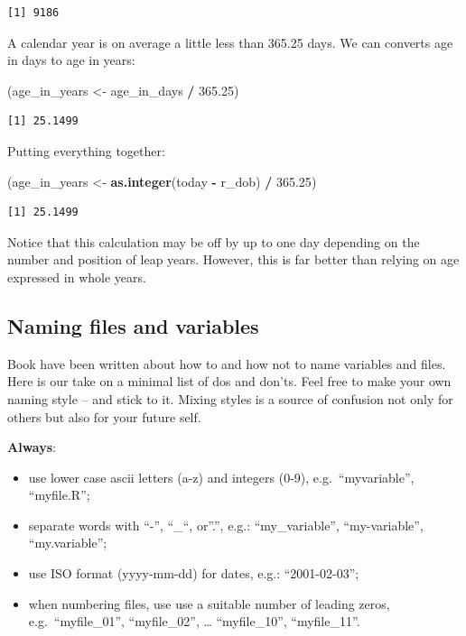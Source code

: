 \documentclass[
]{book}
\newenvironment{Shaded}{\begin{snugshade}}{\end{snugshade}}
\newcommand{\FloatTok}[1]{\textcolor[rgb]{0.00,0.00,0.81}{#1}}
\newcommand{\FunctionTok}[1]{\textcolor[rgb]{0.13,0.29,0.53}{\textbf{#1}}}
\newcommand{\NormalTok}[1]{#1}
\newcommand{\OtherTok}[1]{\textcolor[rgb]{0.56,0.35,0.01}{#1}}
\newcommand{\SpecialCharTok}[1]{\textcolor[rgb]{0.81,0.36,0.00}{\textbf{#1}}}
\begin{document}
\begin{verbatim}
[1] 9186
\end{verbatim}

A calendar year is on average a little less than 365.25 days. We can converts age in days to age in years:

\begin{Shaded}
\begin{Highlighting}[]
\NormalTok{(age\_in\_years }\OtherTok{\textless{}{-}}\NormalTok{ age\_in\_days }\SpecialCharTok{/} \FloatTok{365.25}\NormalTok{)}
\end{Highlighting}
\end{Shaded}

\begin{verbatim}
[1] 25.1499
\end{verbatim}

Putting everything together:

\begin{Shaded}
\begin{Highlighting}[]
\NormalTok{(age\_in\_years }\OtherTok{\textless{}{-}} \FunctionTok{as.integer}\NormalTok{(today }\SpecialCharTok{{-}}\NormalTok{ r\_dob) }\SpecialCharTok{/} \FloatTok{365.25}\NormalTok{)}
\end{Highlighting}
\end{Shaded}

\begin{verbatim}
[1] 25.1499
\end{verbatim}

Notice that this calculation may be off by up to one day depending on the number and position of leap years. However, this is far better than relying on age expressed in whole years.

\subsection{Naming files and variables}\label{naming-files-and-variables}

Book have been written about how to and how not to name variables and files. Here is our take on a minimal list of dos and don'ts. Feel free to make your own naming style -- and stick to it. Mixing styles is a source of confusion not only for others but also for your future self.

\textbf{Always}:

\begin{itemize}
\item
  use lower case ascii letters (a-z) and integers (0-9), e.g.~``myvariable'', ``myfile.R'';
\item
  separate words with ``-'', ``\_``, or''.'', e.g.: ``my\_variable'', ``my-variable'', ``my.variable'';
\item
  use ISO format (yyyy-mm-dd) for dates, e.g.: ``2001-02-03'';
\item
  when numbering files, use use a suitable number of leading zeros, e.g.~``myfile\_01'', ``myfile\_02'', \ldots{} ``myfile\_10'', ``myfile\_11''.
\end{itemize}
\end{document}

